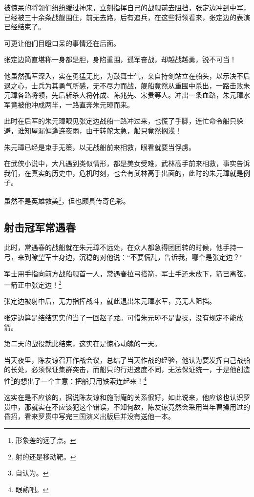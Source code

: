 \begin{multicols}{\theparacolNo}
		被惊呆的将领们纷纷缓过神来，立刻指挥自己的战舰前去阻挡，张定边冲到中军，已经被三十余条战舰围住，前无去路，后有追兵，在这些将领看来，张定边的表演已经结束了。

		可更让他们目瞪口呆的事情还在后面。

		张定边简直堪称一身都是胆，身陷重围，孤军奋战，却越战越勇，锐不可当！

		他虽然孤军深入，实在勇猛无比，为鼓舞士气，亲自持剑站立在船头，以示决不后退之心，士兵为其勇气所感，无不尽力而战，舰船竟然从重围中杀出，一路击败朱元璋各路将领，先后斩杀大将韩成、陈兆先、宋贵等人。冲出一条血路，朱元璋水军竟被他冲成两半，一路直奔朱元璋而来。

		此时在后军的朱元璋眼见张定边战船一路冲过来，也慌了手脚，连忙命令船只躲避，谁知屋漏偏逢连夜雨，由于转舵太急，船只竟然搁浅！

		朱元璋已经是束手无策，以无战船前来相救，眼看就要当俘虏。

		在武侠小说中，大凡遇到类似情形，都是美女受难，武林高手前来相救，事实告诉我们，在真实的历史中，危机时刻，也会有武林高手出面的，此时的朱元璋就是例子。

		虽然不是英雄救美\footnote{形象差的远了点。}，但也颇具传奇色彩。

		\subsection{射击冠军常遇春}
		此时，常遇春的战船就在朱元璋不远处，在众人都急得团团转的时候，他手持一弓，来到瞭望军士身边，沉稳的对他说：“不要慌乱，告诉我，哪个是张定边？”

		军士用手指向前方战船舰首一人，常遇春拉弓搭箭，军士手还未放下，箭已离弦，一箭正中张定边！\footnote{射的还是移动靶。}

		张定边被射中后，无力指挥战斗，就此退出朱元璋水军，竟无人阻挡。

		张定边算是结结实实的当了一回赵子龙。可惜朱元璋不是曹操，没有规定不能放箭。

		第二天的战役就此结束，这实在是惊心动魄的一天。

		当天夜里，陈友谅召开作战会议，总结了当天作战的经验，他认为要发挥自己战船的长处，必须保证集群突击，而船只的行进速度不同，无法保证统一，于是他创造性\footnote{自认为。}的想出了一个主意：把船只用铁索连起来！\footnote{眼熟吧。}

		这实在是不应该的，据说陈友谅和施耐庵的关系很好，如此说来，他应该也认识罗贯中，那就实在不应该犯这个错误，不知何故，陈友谅竟然会采用当年曹操用过的昏招，看来罗贯中写完三国演义出版后并没有送他一本。


\end{multicols}
